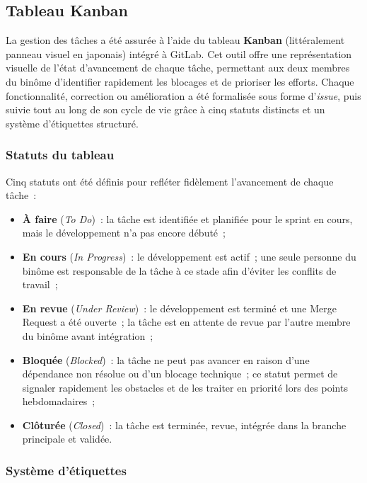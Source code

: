 \subsection{Tableau Kanban}

La gestion des tâches a été assurée à l'aide du tableau \textbf{Kanban} (littéralement
\og{}panneau visuel\fg{} en japonais) intégré à GitLab. Cet outil offre une représentation
visuelle de l'état d'avancement de chaque tâche, permettant aux deux membres du binôme
d'identifier rapidement les blocages et de prioriser les efforts. Chaque fonctionnalité,
correction ou amélioration a été formalisée sous forme d'\textit{issue}, puis suivie tout au
long de son cycle de vie grâce à cinq statuts distincts et un système d'étiquettes structuré.

\subsubsection*{Statuts du tableau}

Cinq statuts ont été définis pour refléter fidèlement l'avancement de chaque tâche~:

\begin{itemize}
    \item \textbf{À faire} (\textit{To Do})~: la tâche est identifiée et planifiée pour le sprint
          en cours, mais le développement n'a pas encore débuté~;
    \item \textbf{En cours} (\textit{In Progress})~: le développement est actif~; une seule
          personne du binôme est responsable de la tâche à ce stade afin d'éviter les conflits
          de travail~;
    \item \textbf{En revue} (\textit{Under Review})~: le développement est terminé et une Merge
          Request a été ouverte~; la tâche est en attente de revue par l'autre membre du binôme
          avant intégration~;
    \item \textbf{Bloquée} (\textit{Blocked})~: la tâche ne peut pas avancer en raison d'une
          dépendance non résolue ou d'un blocage technique~; ce statut permet de signaler
          rapidement les obstacles et de les traiter en priorité lors des points hebdomadaires~;
    \item \textbf{Clôturée} (\textit{Closed})~: la tâche est terminée, revue, intégrée dans la
          branche principale et validée.
\end{itemize}

\subsubsection*{Système d'étiquettes}

